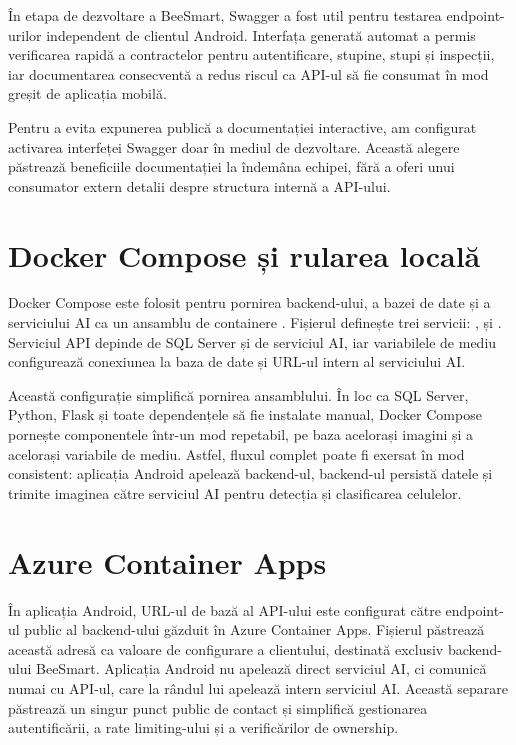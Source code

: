 În etapa de dezvoltare a BeeSmart, Swagger a fost util pentru testarea endpoint-urilor independent de clientul Android. Interfața generată automat a permis verificarea rapidă a contractelor pentru autentificare, stupine, stupi și inspecții, iar documentarea consecventă a redus riscul ca API-ul să fie consumat în mod greșit de aplicația mobilă.

Pentru a evita expunerea publică a documentației interactive, am configurat activarea interfeței Swagger doar în mediul de dezvoltare. Această alegere păstrează beneficiile documentației la îndemâna echipei, fără a oferi unui consumator extern detalii despre structura internă a API-ului.

\section{Docker Compose și rularea locală}

Docker Compose este folosit pentru pornirea backend-ului, a bazei de date și a serviciului AI ca un ansamblu de containere \cite{dockerComposeDocs}. Fișierul  definește trei servicii: ,  și . Serviciul API depinde de SQL Server și de serviciul AI, iar variabilele de mediu configurează conexiunea la baza de date și URL-ul intern al serviciului AI.

Această configurație simplifică pornirea ansamblului. În loc ca SQL Server, Python, Flask și toate dependențele să fie instalate manual, Docker Compose pornește componentele într-un mod repetabil, pe baza acelorași imagini și a acelorași variabile de mediu. Astfel, fluxul complet poate fi exersat în mod consistent: aplicația Android apelează backend-ul, backend-ul persistă datele și trimite imaginea către serviciul AI pentru detecția și clasificarea celulelor.

\section{Azure Container Apps}

În aplicația Android, URL-ul de bază al API-ului este configurat către endpoint-ul public al backend-ului găzduit în Azure Container Apps. Fișierul  păstrează această adresă ca valoare de configurare a clientului, destinată exclusiv backend-ului BeeSmart. Aplicația Android nu apelează direct serviciul AI, ci comunică numai cu API-ul, care la rândul lui apelează intern serviciul AI. Această separare păstrează un singur punct public de contact și simplifică gestionarea autentificării, a rate limiting-ului și a verificărilor de ownership.

